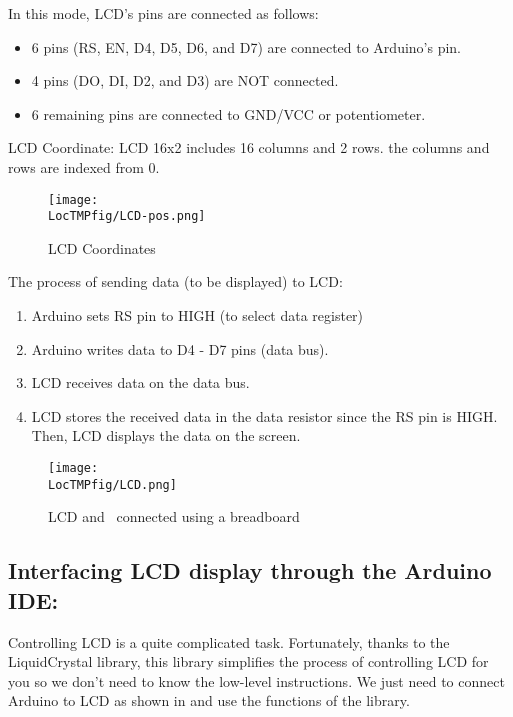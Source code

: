 In this mode, LCD's pins are connected as follows:
\begin{itemize}
\item 6 pins (RS, EN, D4, D5, D6, and D7) are connected to
Arduino's pin.
\item 4 pins (DO, DI, D2, and D3) are NOT connected.
\item 6 remaining pins are connected to GND/VCC or
potentiometer.
\end{itemize}

LCD Coordinate: LCD 16x2 includes 16 columns and 2 rows. the
columns and rows are indexed from 0.
\begin{figure}
  \centering
  \texttt{[image: \\LocTMPfig/LCD-pos.png]}
  \caption{LCD Coordinates}
  \label{fig:LCD-pos}
\end{figure}

The process of sending data (to be displayed) to LCD:
\begin{enumerate}
\item Arduino sets RS pin to HIGH (to select data register)
\item Arduino writes data to D4 - D7 pins (data bus).
\item LCD receives data on the data bus.
\item LCD stores the received data in the data resistor since
the RS pin is HIGH. Then, LCD displays the data on the screen.
\end{enumerate}

\begin{figure}
  \centering
  \texttt{[image: \\LocTMPfig/LCD.png]}
  \caption{LCD and \arduino\ connected using a breadboard}
  \label{fig:ard-lcd}
\end{figure}

\subsection{Interfacing LCD display through the Arduino IDE:}
Controlling LCD is a quite complicated task. Fortunately, thanks
to the LiquidCrystal library, this library simplifies the
process of controlling LCD for you so we don't need to know the
low-level instructions. We just need to connect Arduino to LCD
as shown in  and use the functions of the
library.

